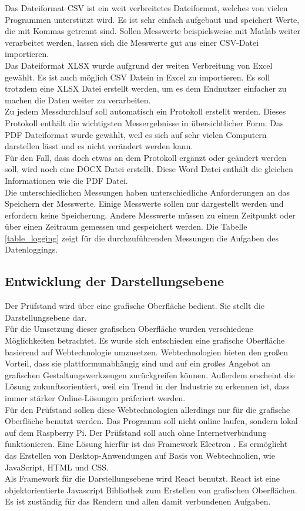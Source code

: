 \noindent
Das Dateiformat CSV ist ein weit verbreitetes Dateiformat, welches von vielen Programmen unterstützt wird. Es ist sehr einfach aufgebaut und speichert Werte, die mit Kommas getrennt sind. Sollen Messwerte beispielsweise mit Matlab weiter verarbeitet werden, lassen sich die Messwerte gut aus einer CSV-Datei importieren.\\
Das Dateiformat XLSX wurde aufgrund der weiten Verbreitung von Excel gewählt. Es ist auch möglich CSV Datein in Excel zu importieren. Es soll trotzdem eine XLSX Datei erstellt werden, um es dem Endnutzer einfacher zu machen die Daten weiter zu verarbeiten.
\\
Zu jedem Messdurchlauf soll automatisch ein Protokoll erstellt werden. Dieses Protokoll enthält die wichtigsten Messergebnisse in übersichtlicher Form. Das PDF Dateiformat wurde gewählt, weil es sich auf sehr vielen Computern darstellen lässt und es nicht verändert werden kann.
\\
Für den Fall, dass doch etwas an dem Protokoll ergänzt oder geändert werden soll, wird noch eine DOCX Datei erstellt. Diese Word Datei enthält die gleichen Informationen wie die PDF Datei.
\\
Die unterschiedlichen Messungen haben unterschiedliche Anforderungen an das Speichern der Messwerte. Einige Messwerte sollen nur dargestellt werden und erfordern keine Speicherung. Andere Messwerte müssen zu einem Zeitpunkt oder über einen Zeitraum gemessen und gespeichert werden. Die Tabelle \ref{table_logging} zeigt für die durchzuführenden Messungen die Aufgaben des Datenloggings.


\noindent

\subsection{Entwicklung der Darstellungsebene}
Der Prüfstand wird über eine grafische Oberfläche bedient. Sie stellt die Darstellungsebene dar.
\\
Für die Umsetzung dieser grafischen Oberfläche wurden verschiedene Möglichkeiten betrachtet. Es wurde sich entschieden eine grafische Oberfläche basierend auf Webtechnologie umzusetzen. Webtechnologien bieten den großen Vorteil, dass sie plattformunabhängig sind und auf ein großes Angebot an grafischen Gestaltungswerkzeugen zurückgreifen können. Außerdem erscheint die Lösung zukunftsorientiert, weil ein Trend in der Industrie zu erkennen ist, dass immer stärker Online-Lösungen präferiert werden.
\\
Für den Prüfstand sollen diese Webtechnologien allerdings nur für die grafische Oberfläche benutzt werden. Das Programm soll nicht online laufen, sondern lokal auf dem Raspberry Pi. Der Prüfstand soll auch ohne Internetverbindung funktionieren. Eine Lösung hierfür ist das Framework Electron \cite{electron}. Es ermöglicht das Erstellen von Desktop-Anwendungen auf Basis von Webtechnolien, wie JavaScript, HTML und CSS.
\cite{electron}
\\
Als Framework für die Darstellungsebene wird React benutzt. React ist eine objektorientierte Javascript Bibliothek zum Erstellen von grafischen Oberflächen. Es ist zuständig für das Rendern und allen damit verbundenen Aufgaben.
\cite{react}

